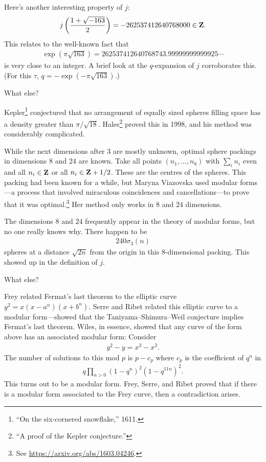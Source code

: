 \documentclass[11pt, oneside,margin=1in]{article}
\begin{document}
Here's another interesting property of $j$:
\begin{align*}
	j\left( \frac{1+\sqrt{-163} }{2} \right) = -262537412640768000\in \mathbf Z.
\end{align*}
This relates to the well-known fact that 
\begin{align*}
	\exp(\pi \sqrt{163} ) = 262537412640768743.99999999999925\cdots
\end{align*}
is very close to an integer. A brief look at the $q$-expansion of $j$ corroborates this. (For this $\tau$, $q=-\exp(-\pi\sqrt{163} )$.)

What else?

\begin{example}\label{}\text{}
Kepler\footnote{``On the six-cornered snowflake,'' 1611.} conjectured that no arrangement of equally sized spheres filling space has a density greater than $\pi/\sqrt{18}$. Hales\footnote{``A proof of the Kepler conjecture.''} proved this in 1998, and his method was considerably complicated. 

While the next dimensions after $3$ are mostly unknown, optimal sphere packings in dimensions $8$ and $24$ are known. Take all points $(n_1,\hdots, n_8)$ with $\sum_{i}^{} n_i$ even and all $n_i\in \mathbf Z$ or all $n_i\in \mathbf Z + 1/2$. These are the centres of the spheres. This packing had been known for a while, but Maryna Viazovska used modular forms---a process that involved miraculous coincidences and cancellations---to prove that it was optimal.\footnote{See \url{https://arxiv.org/abs/1603.04246}.} Her method only works in $8$ and $24$ dimensions.

The dimensions $8$ and $24$ frequently appear in the theory of modular forms, but no one really knows why. There happen to be
\begin{align*}
	240\sigma_3(n)
\end{align*}
spheres at a distance $\sqrt{2n} $ from the origin in this $8$-dimensional packing. This showed up in the definition of $j$.
\end{example}


What else? 
\begin{example}\label{}\text{}
Frey related Fermat's last theorem to the elliptic curve $y^2 = x(x-a^n) (x+b^n)$. Serre and Ribet related this elliptic curve to a modular form---showed that the Taniyama--Shimura--Weil conjecture implies Fermat's last theorem. Wiles, in essence, showed that any curve of the form above has an associated modular form: Consider
\begin{align*}
	y^2 - y = x^3-x^2.
\end{align*}
The number of solutions to this mod $p$ is $p-c_p$ where $c_p$ is the coefficient of $q^n$ in 
\begin{align*}
	q\prod_{n>0} (1-q^n)^2 (1-q^{11n})^2.
\end{align*}
This turns out to be a modular form. Frey, Serre, and Ribet proved that if there is a modular form associated to the Frey curve, then a contradiction arises. 
\end{example}
\end{document}
